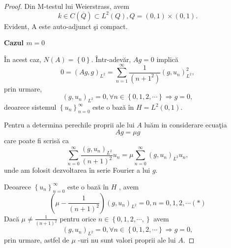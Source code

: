 \documentclass[a4paper,12pt,oneside]{report}
\begin{document}
\begin{proof}
Din M-testul lui Weierstrass, avem
\begin{displaymath}
  k \in C\left ( \overline{Q} \right ) \subset L^{2}\left ( Q \right ), Q = \left ( 0,1 \right )\times \left ( 0,1 \right ).
\end{displaymath}
Evident, A este auto-adjunct \c{s}i compact.

\noindent \textbf{Cazul \(m = 0\)}

\noindent \^{I}n acest caz, \(N\left ( A \right ) = \left \{ 0 \right \}\). \^{I}ntr-adev\u{a}r, \(Ag = 0\) implic\u{a}
\begin{displaymath}
  0 = \left ( Ag,g \right )_{L^{2}} = \sum_{n= 1}^{\infty }\frac{1}{\left ( n+1^{2} \right )}\left ( g , u_{n} \right )_{L^{2}}^{2},
\end{displaymath}
prin urmare,
\begin{displaymath}
  \left ( g,u_{n} \right )_{L^{2}} = 0, \forall n \in \left \{ 0,1,2,\cdots \right \}\Rightarrow g = 0,
\end{displaymath}
deoarece sistemul \(\left \{ u_{n} \right \}_{n=0}^{\infty }\) este o baz\u{a} \^{i}n \(H = L^{2}\left ( 0,1 \right )\).

\noindent Pentru a determina perechile proprii ale lui \(A\) lu\u{a}m in considerare ecua\c{t}ia
\begin{displaymath}
  Ag = \mu g
\end{displaymath}
 care poate fi scris\u{a} ca
\begin{displaymath}
  \sum_{n = 0}^{\infty }\frac{\left ( g, u_{n} \right )_{L^{2}}}{\left ( n+1 \right )^{2}}u_{n} = \mu \sum_{n = 0}^{\infty }\left ( g, u_{n} \right )_{L^{2}}u_{n},
\end{displaymath}
unde am folosit dezvoltarea \^{i}n serie Fourier a lui \(g\).

Deoarece \(\left \{ u_{n} \right \}_{n = 0}^{\infty }\) este o baz\u{a} \^{i}n \(H\) , avem
\begin{displaymath}
  \left ( \mu  - \frac{1}{\left ( n+1 \right )^{2}} \right )\left ( g,u_{n} \right )_{L^{2}} = 0, n = 0,1,2,\cdots (*)
\end{displaymath}
Dac\u{a} \(\mu \neq \frac{1}{\left ( n+1 \right )^{2}}\) pentru orice \(n\in \left \{ 0,1,2,\cdots, \right \}\) avem
\begin{displaymath}
  \left ( g,u_{n} \right )_{L^{2}} = 0, \forall n\in \left \{ 0,1,2,\cdots \right \}\Rightarrow g = 0,
\end{displaymath}
prin urmare, astfel de  \(\mu\)  -uri nu sunt valori proprii ale lui \(A\).


\end{proof}
\end{document}
